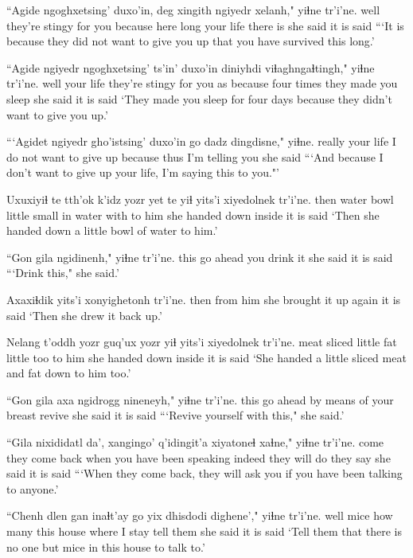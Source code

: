 \documentclass[12pt]{article}
\begin{document}
\gll ``Agide ngoghxetsing'   duxo'in,  deg xingith ngiyedr xelanh," yiɬne  tr'i'ne.
well  {they're stingy for you} because here long  {your life} {there is} {she said} {it is said}
\glt ```It is because they did not want to give you up that you have survived this long.'
\glend

\gll ``Agide ngiyedr ngoghxetsing' ts'in' duxo'in  diniyhdi viɬaghngaɬtingh,"   yiɬne  tr'i'ne.
well  {your life} {they're stingy for you} as because {four times} {they made you sleep} {she said} {it is said}
\glt `They made you sleep for four days because they didn't want to give you up.'
\glend

\gll ```Agidet ngiyedr gho'istsing'   duxo'in  {go dadz} dingdisne,"  yiɬne.
really  {your life} {I do not want to give up} because thus {I'm telling you} {she said}
\glt ```And because I don't want to give up your life, I'm saying this to you."'
\glend

\gll Uxuxiyiɬ te tth'ok k'idz yozr yet te yiɬ yits'i xiyedolnek  tr'i'ne.
then  water bowl little small in water with {to him} {she handed down inside} {it is said}
\glt `Then she handed down a little bowl of water to him.'
\glend

\gll ``Gon gila ngidinenh,"  yiɬne  tr'i'ne.
this {go ahead} {you drink it}   {she said} {it is said}
\glt ```Drink this," she said.'
\glend

\gll Axaxiɬdik yits'i xonyighetonh tr'i'ne.
then  {from him} {she brought it up again} {it is said}
\glt `Then she drew it back up.'
\glend

\gll Nelang t'oddh yozr guq'ux yozr yiɬ yits'i xiyedolnek tr'i'ne.
meat  sliced  little fat  little too {to him} {she handed down inside} {it is said}
\glt `She handed a little sliced meat and fat down to him too.'
\glend

\gll ``Gon gila axa ngidrogg nineneyh," yiɬne  tr'i'ne.
this {go ahead} {by means of} {your breast} revive {she said} {it is said}
\glt ```Revive yourself with this," she said.'
\glend

\gll ``Gila nixididatl  da', xangingo'   q'idingit'a xiyatoneɬ xaɬne," yiɬne  tr'i'ne.
come  {they come back} when {you have been speaking} indeed {they will do} {they say} {she said} {it is said}
\glt ```When they come back, they will ask you if you have been talking to anyone.'
\glend

\gll ``Chenh dlen {gan inaɬt'ay} go yix dhisdodi dighene'," yiɬne  tr'i'ne.
well mice {how many}  this house {where I stay} {tell them} {she said} {it is said}
\glt `Tell them that there is no one but mice in this house to talk to.'
\glend
\end{document}
